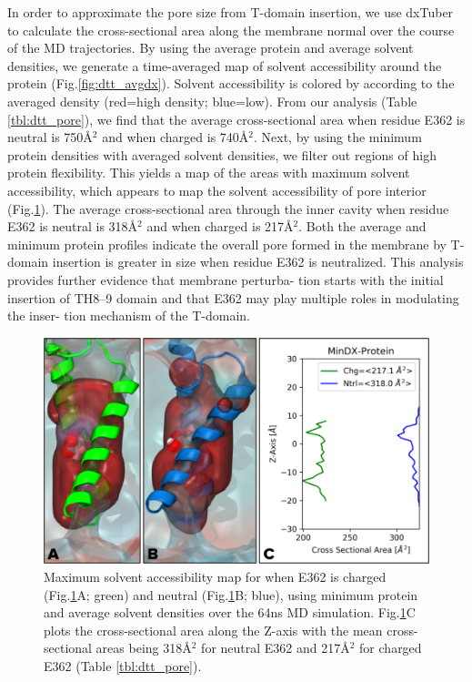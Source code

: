 In order to approximate the pore size from T-domain insertion, we use dxTuber to calculate the cross-sectional area along the membrane normal over the course of the MD trajectories. 
By using the average protein and average solvent densities, we generate a time-averaged map of solvent accessibility around the protein (Fig.\ref{fig:dtt_avgdx}).
Solvent accessibility is colored by according to the averaged density (red=high density; blue=low).
From our analysis (Table \ref{tbl:dtt_pore}), we find that the average cross-sectional area when residue E362 is neutral is 750\AA$^2$ and when charged is 740\AA$^2$.
Next, by using the minimum protein densities with averaged solvent densities, we filter out regions of high protein flexibility.
This yields a map of the areas with maximum solvent accessibility, which appears to map the solvent accessibility of pore interior (Fig.\ref{fig:dtt_mindx}).
The average cross-sectional area through the inner cavity when residue E362 is neutral is 318\AA$^2$ and when charged is 217\AA$^2$.
Both the average and minimum protein profiles indicate the overall pore formed in the membrane by T-domain insertion is greater in size when residue E362 is neutralized.
This analysis provides further evidence that membrane perturba- tion starts with the initial insertion of TH8–9 domain and that E362 may play multiple roles in modulating the inser- tion mechanism of the T-domain.

\begin{figure}[H]
\centering
\includegraphics[width=\linewidth,]{Figures/DTT/mindx.png}
\caption[Solvent accesibility map for Charged E362 DTT Pore]{Maximum solvent accessibility map for when E362 is charged (Fig.\ref{fig:dtt_mindx}A; green) and neutral (Fig.\ref{fig:dtt_mindx}B; blue), using minimum protein and average solvent densities over the 64ns MD simulation. Fig.\ref{fig:dtt_mindx}C plots the cross-sectional area along the Z-axis with the mean cross-sectional areas being 318\AA$^2$ for neutral E362 and 217\AA$^2$ for charged E362 (Table \ref{tbl:dtt_pore}).}
\label{fig:dtt_mindx}
\end{figure}

